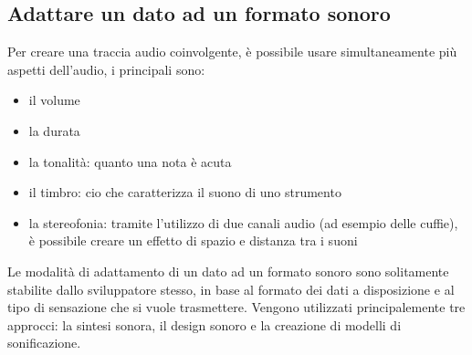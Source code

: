 \subsection{Adattare un dato ad un formato sonoro}
Per creare una traccia audio coinvolgente, è possibile usare simultaneamente più aspetti dell'audio, i principali sono:
\begin{itemize}
  \item{il volume}
  \item{la durata}
  \item{la tonalità: quanto una nota è acuta}
  \item{il timbro: cio che caratterizza il suono di uno strumento}
  \item{la stereofonia: tramite l'utilizzo di due canali audio (ad esempio delle cuffie), è possibile creare un effetto di spazio e distanza tra i suoni}
\end{itemize}
Le modalità di adattamento di un dato ad un formato sonoro sono solitamente stabilite dallo sviluppatore stesso, in base al formato dei dati a disposizione e al tipo di sensazione che si vuole trasmettere.
Vengono utilizzati principalemente tre approcci: la sintesi sonora, il design sonoro e la creazione di modelli di sonificazione.
